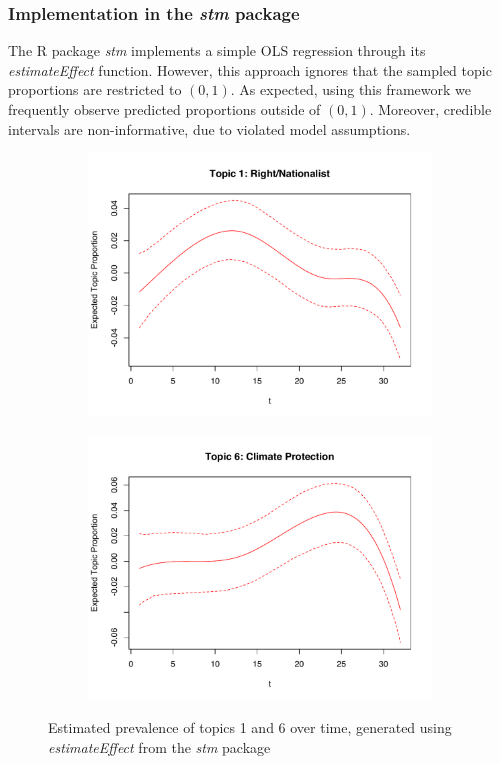 \subsubsection{Implementation in the \textit{stm} package}

The R package \textit{stm} implements a simple OLS regression through its \textit{estimateEffect} function. However, this approach ignores that the sampled topic proportions are restricted to $(0,1)$. As expected, using this framework we frequently observe predicted proportions outside of $(0,1)$. Moreover, credible intervals are non-informative, due to violated model assumptions. 

\begin{figure}[h!]
  \centering
  \captionsetup{justification=centering,margin=2cm}
  \begin{subfigure}[b]{0.4\linewidth}
    \includegraphics[width=\linewidth]{../plots/4_4/estEffect_topic1.pdf}
  \end{subfigure}
  \begin{subfigure}[b]{0.4\linewidth}
    \includegraphics[width=\linewidth]{../plots/4_4/estEffect_topic6.pdf}
  \end{subfigure}
  \caption{Estimated prevalence of topics 1 and 6 over time, generated using \textit{estimateEffect} from the \textit{stm} package}
  \label{fig:coffee}
\end{figure}

